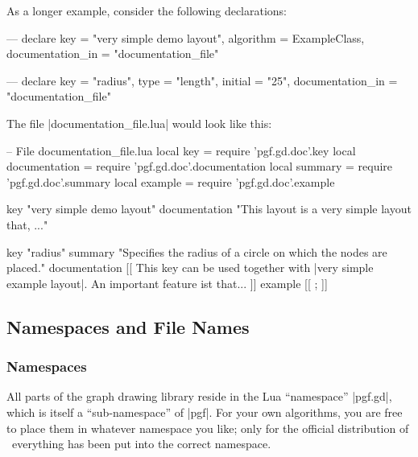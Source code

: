 
As a longer example, consider the following declarations:

\begin{codeexample}[code only, tikz syntax=false]
---
declare {
  key               = "very simple demo layout",
  algorithm         = ExampleClass,
  documentation_in  = "documentation_file"
}

--- 
declare {
  key               = "radius",
  type              = "length",
  initial           = "25",
  documentation_in  = "documentation_file"
}
\end{codeexample}

The file |documentation_file.lua| would look like this:

\begin{codeexample}[code only, tikz syntax=false]
-- File documentation_file.lua
local key           = require 'pgf.gd.doc'.key
local documentation = require 'pgf.gd.doc'.documentation
local summary       = require 'pgf.gd.doc'.summary
local example       = require 'pgf.gd.doc'.example

key           "very simple demo layout"
documentation "This layout is a very simple layout that, ..."

key           "radius"
summary       "Specifies the radius of a circle on which the nodes are placed."
documentation
[[
This key can be used together with |very simple example layout|. An
important feature ist that...
]]
example
[[
\tikz {};
]]
\end{codeexample}




\subsection{Namespaces and File Names}

\label{section-gd-namespaces}

\subsubsection{Namespaces}

All parts of the graph drawing library reside in the Lua ``namespace''
|pgf.gd|, which is itself a ``sub-namespace'' of |pgf|. For your own
algorithms, you are free to place them in whatever namespace you like;
only for the official distribution of \pgfname\ everything has been
put into the correct namespace.

